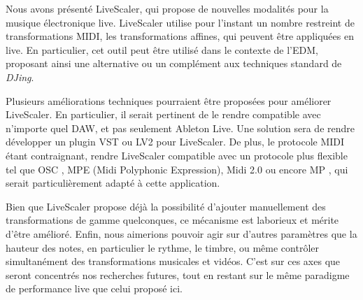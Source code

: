 Nous avons présenté LiveScaler, qui propose de nouvelles modalités pour la musique électronique live. Live\-Scaler utilise pour l'instant un nombre restreint de transformations MIDI, les transformations affines, qui peuvent être appliquées en live. En particulier, cet outil peut être utilisé dans le contexte de l'EDM, proposant ainsi une alternative ou un complément aux techniques standard de \emph{DJing}.

Plusieurs améliorations techniques pourraient être proposées pour améliorer LiveScaler. En particulier, il serait pertinent de le rendre compatible avec n'importe quel DAW, et pas seulement Ableton Live. Une solution sera de rendre développer un plugin VST ou LV2 pour LiveScaler. De plus, le protocole MIDI étant contraignant, rendre LiveScaler compatible avec un protocole plus flexible tel que OSC \cite{wright2005open}, MPE (Midi Polyphonic Expression), Midi 2.0 ou encore  MP \cite{goudard2017mapping}, qui serait particulièrement adapté à cette application.

Bien que LiveScaler propose déjà la possibilité d'ajouter manuellement des transformations de gamme quelconques, ce mécanisme est laborieux et mérite d'être amélioré. Enfin, nous aimerions pouvoir agir sur d'autres paramètres que la hauteur des notes, en particulier le rythme, le timbre, ou même contrôler simultanément des transformations musicales et vidéos. C'est sur ces axes que seront concentrés nos recherches futures, tout en restant sur le même paradigme de performance live que celui proposé ici.
